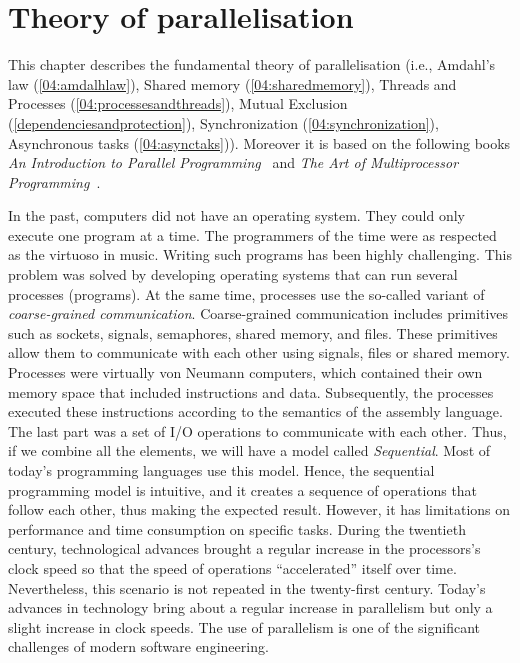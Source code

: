 \chapter{Theory of parallelisation}
\label{03:chapter:title}

This chapter describes the fundamental theory of parallelisation (i.e., Amdahl's law (\ref{04:amdalhlaw}), Shared memory (\ref{04:sharedmemory}), Threads and Processes (\ref{04:processesandthreads}), Mutual Exclusion (\ref{dependenciesandprotection}), Synchronization (\ref{04:synchronization}), Asynchronous tasks (\ref{04:asynctaks})).
Moreover it is based on the following books \emph{An Introduction to Parallel Programming}~\cite{introductionToParallelProgramming} and \emph{The Art of Multiprocessor Programming}~\cite{artOfMultiprocessorProgramming}.

In the past, computers did not have an operating system.
They could only execute one program at a time.
The programmers of the time were as respected as the virtuoso in music.
Writing such programs has been highly challenging.
This problem was solved by developing operating systems that can run several processes (programs).
At the same time, processes use the so-called variant of \emph{coarse-grained communication}.
Coarse-grained communication includes primitives such as sockets, signals, semaphores, shared memory, and files.
These primitives allow them to communicate with each other using signals, files or shared memory.
Processes were virtually von Neumann computers, which contained their own memory space that included instructions and data.
Subsequently, the processes executed these instructions according to the semantics of the assembly language.
The last part was a set of I/O operations to communicate with each other.
Thus, if we combine all the elements, we will have a model called \emph{Sequential}.
Most of today's programming languages use this model.
Hence, the sequential programming model is intuitive, and it creates a sequence of operations that follow each other, thus making the expected result.
However, it has limitations on performance and time consumption on specific tasks.
During the twentieth century, technological advances brought a regular increase in the processors's clock speed so that the speed of operations ``accelerated'' itself over time.
Nevertheless, this scenario is not repeated in the twenty-first century.
Today's advances in technology bring about a regular increase in parallelism but only a slight increase in clock speeds.
The use of parallelism is one of the significant challenges of modern software engineering.

